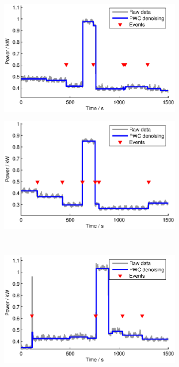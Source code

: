 \begin{figure}[htbp]
    \centering
    \begin{subfigure}[t]{0.47\textwidth}
        \centering
        \includegraphics[width=\textwidth] {../../sw/pc/matlab/pwc-result/1.eps}
        \caption{}
    \end{subfigure} 
    \begin{subfigure}[t]{0.47\textwidth}
        \centering
        \includegraphics[width=\textwidth] {../../sw/pc/matlab/pwc-result/2.eps}
        \caption{}
    \end{subfigure} 
    \\
    \begin{subfigure}[t]{0.47\textwidth}
        \centering
        \includegraphics[width=\textwidth] {../../sw/pc/matlab/pwc-result/3.eps}

\end{subfigure}
\end{figure}
